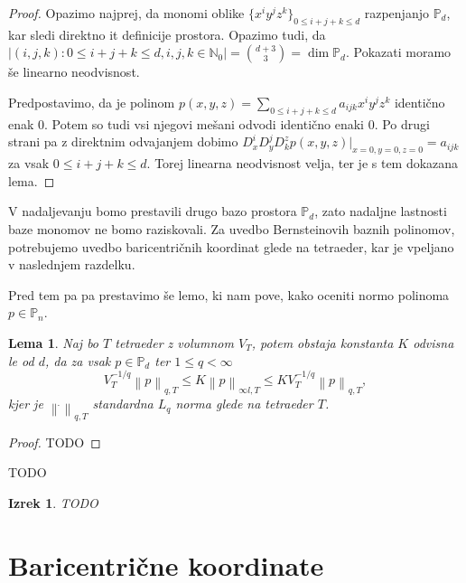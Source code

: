 \documentclass[11pt,a4paper]{article}
\newtheorem{lemma}{Lema}
\newtheorem{theorem}{Izrek}
\begin{document}
\begin{proof}
    Opazimo najprej, da monomi oblike $\{x^i y^j z^k\}_{0 \le i  + j + k \le d}$
    razpenjanjo $\mathbb{P}_d$, kar sledi direktno it definicije 
    prostora. Opazimo tudi, da 
    $|\left(i, j , k\right): 0\le i+j+k \le d , i,j,k \in \mathbb{N}_0| = \binom{d+3}{3} = \dim\mathbb{P}_d$.
    Pokazati moramo še linearno neodvisnost.  

    Predpostavimo, da je polinom $p(x,y,z) =\sum_{0 \le i  + j + k \le d} a_{ijk} x^i y^j z^k $
    identično enak 0. Potem so tudi vsi njegovi mešani odvodi identično enaki 0.
    Po drugi strani pa z direktnim odvajanjem dobimo
    $D^i_xD^j_yD^z_k p(x,y,z)|_{x =0 ,y =0, z = 0} = a_{ijk}$ za vsak 
    $0 \le i  + j + k \le d$. Torej linearna neodvisnost velja, ter
    je s tem dokazana lema.
\end{proof}

V nadaljevanju bomo prestavili drugo bazo prostora $\mathbb{P}_d$, zato 
nadaljne lastnosti baze monomov ne bomo raziskovali. Za uvedbo Bernsteinovih
baznih polinomov, potrebujemo uvedbo baricentričnih koordinat glede na 
tetraeder, kar je vpeljano v naslednjem razdelku.

Pred tem pa pa prestavimo še lemo, ki nam pove, kako oceniti 
normo polinoma $p \in \mathbb{P}_n$.

\begin{lemma}\label{lema_norma}
    Naj bo $T$ tetraeder z volumnom $V_T$, potem obstaja 
    konstanta $K$ odvisna le od $d$, da za vsak  $p \in \mathbb{P}_d$ ter $1 \le q < \infty$
    \begin{equation}
        V_T^{-1/q} \left\lVert p \right\rVert_{q,T} \le K \left\lVert p \right\rVert_{\infty l, T} \le K V_T^{-1/q} \left\lVert p \right\rVert_{q,T},
    \end{equation}
    kjer je $\left\lVert \dot{} \right\rVert_{q,T}$ standardna $L_q$ norma 
    glede na tetraeder $T$.
\end{lemma}

\begin{proof}
    TODO
\end{proof}

TODO 

\begin{theorem}
    TODO
\end{theorem}

\section{Baricentrične koordinate}
\end{document}
